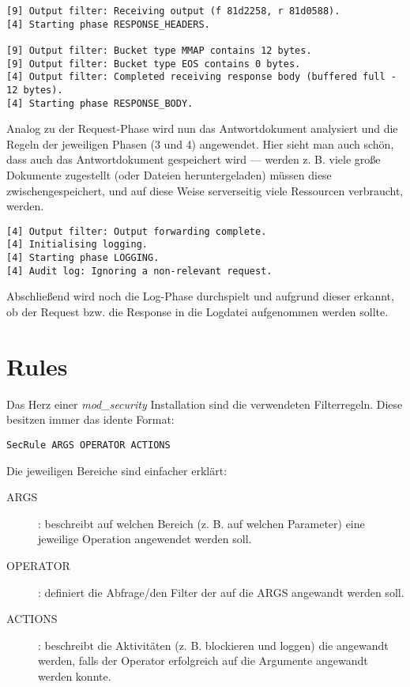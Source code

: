 \begin{verbatim}
[9] Output filter: Receiving output (f 81d2258, r 81d0588).
[4] Starting phase RESPONSE_HEADERS.

[9] Output filter: Bucket type MMAP contains 12 bytes.
[9] Output filter: Bucket type EOS contains 0 bytes.
[4] Output filter: Completed receiving response body (buffered full - 12 bytes).
[4] Starting phase RESPONSE_BODY.
\end{verbatim}

Analog zu der Request-Phase wird nun das Antwortdokument analysiert und die Regeln der jeweiligen Phasen (3 und 4) angewendet. Hier sieht man auch schön, dass auch das Antwortdokument gespeichert wird --- werden z. B. viele große Dokumente zugestellt (oder Dateien heruntergeladen) müssen diese zwischengespeichert, und auf diese Weise serverseitig viele Ressourcen verbraucht, werden.

\begin{verbatim}
[4] Output filter: Output forwarding complete.
[4] Initialising logging.
[4] Starting phase LOGGING.
[4] Audit log: Ignoring a non-relevant request.
\end{verbatim}

Abschließend wird noch die Log-Phase durchspielt und aufgrund dieser erkannt, ob der Request bzw. die Response in die Logdatei aufgenommen werden sollte.

\section{Rules}

Das Herz einer \textit{mod\_security} Installation sind die verwendeten Filterregeln. Diese besitzen immer das idente Format:

\begin{verbatim}
SecRule ARGS OPERATOR ACTIONS
\end{verbatim}

Die jeweiligen Bereiche sind einfacher erklärt:

\begin{description}
	\item[ARGS]: beschreibt auf welchen Bereich (z. B. auf welchen Parameter) eine jeweilige Operation angewendet werden soll.
	\item[OPERATOR]: definiert die Abfrage/den Filter der auf die ARGS angewandt werden soll.
	\item[ACTIONS]: beschreibt die Aktivitäten (z. B. blockieren und loggen) die angewandt werden, falls der Operator erfolgreich auf die Argumente angewandt werden konnte.
\end{description}


